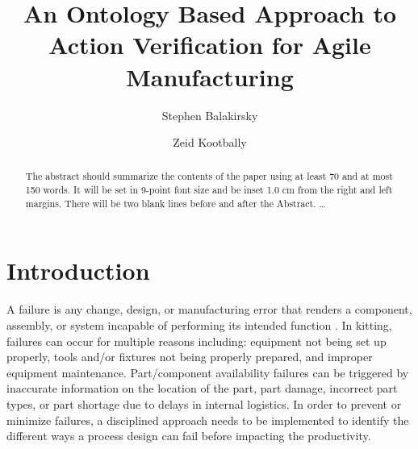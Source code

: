 \documentclass{llncs}
\begin{document}
%
\frontmatter          %
%
\pagestyle{headings}  %
%
%
\mainmatter              %
%
\title{An Ontology Based Approach to Action Verification for Agile Manufacturing}
%
%
\author{Stephen Balakirsky \and Zeid Kootbally}
%
%
%

\maketitle              %

\begin{abstract}
The abstract should summarize the contents of the paper
using at least 70 and at most 150 words. It will be set in 9-point
font size and be inset 1.0 cm from the right and left margins.
There will be two blank lines before and after the Abstract. \dots
{}
\end{abstract}
%
%
\section{Introduction}
A failure is any change, design, or manufacturing error that renders a component, assembly, or system incapable of performing its intended function \cite{Collins93}. In kitting, failures can occur for multiple reasons including: equipment not being set up properly, tools and/or fixtures not being properly prepared, and improper equipment maintenance. Part/component availability failures can be triggered by inaccurate information on the location of the part, part damage, incorrect part types, or part shortage due to delays in internal logistics. In order to prevent or minimize failures, a disciplined approach needs to be implemented to identify the different ways a process design can fail before impacting the productivity.
\end{document}
